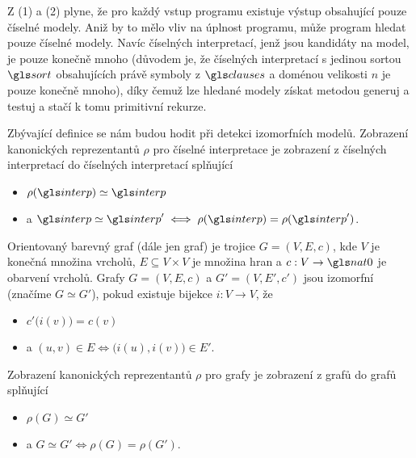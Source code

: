 Z (1) a (2) plyne, že pro každý vstup programu existuje výstup
obsahující pouze číselné modely. Aniž by to mělo vliv na úplnost
programu, může program hledat pouze číselné modely.
Navíc číselných interpretací, jenž jsou kandidáty na model,
je pouze konečně mnoho (důvodem je, že
číselných interpretací s jedinou sortou $\sort$ obsahujících právě symboly
z $\clauses$ a doménou velikosti $n$ je pouze konečně mnoho),
díky čemuž lze hledané
modely získat metodou generuj a testuj a stačí k tomu primitivní rekurze.

Zbývající definice se nám budou hodit při detekci izomorfních modelů.
Zobrazení kanonických reprezentantů $\rho$ pro číselné interpretace
je zobrazení z číselných interpretací do číselných interpretací splňující
\begin{itemize}
\item $\rho(\interp) \simeq \interp$
\item a $\interp \simeq \interp' \iff \rho(\interp) = \rho(\interp')$.
\end{itemize}

Orientovaný barevný graf (dále jen graf) je trojice $G = (V, E, c)$, kde
$V$ je konečná množina vrcholů, $E \subseteq V \times V$ je množina hran
a $c : V \to \nat0$ je obarvení vrcholů. Grafy
$G = (V, E, c)$ a $G' = (V, E', c')$ jsou izomorfní (značíme $G \simeq G'$),
pokud existuje bijekce $i : V \to V$, že
\begin{itemize}
\item $c'\bigl(i(v)\bigr) = c(v)$
\item a $(u, v) \in E \iff \bigl(i(u), i(v)\bigr) \in E'$.
\end{itemize}

Zobrazení kanonických reprezentantů $\rho$ pro grafy
je zobrazení z grafů do grafů splňující
\begin{itemize}
\item $\rho(G) \simeq G'$
\item a $G \simeq G' \iff \rho(G) = \rho(G')$.
\end{itemize}


